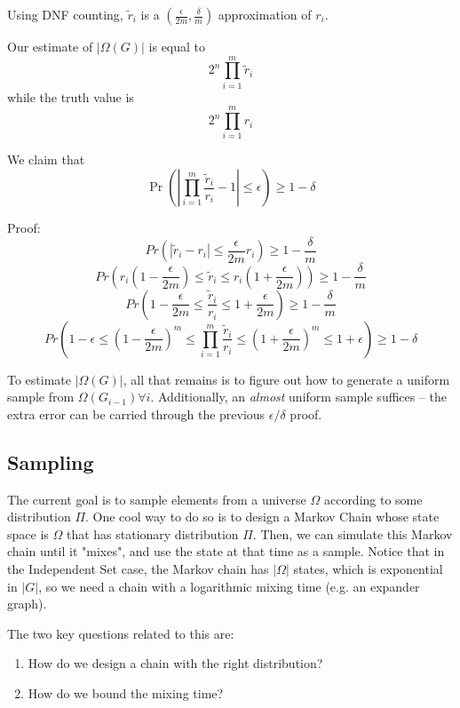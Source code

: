 Using DNF counting, $\tilde r_i$ is a $(\frac{\epsilon}{2m}, \frac{\delta}{m})$ approximation of $r_i$.

Our estimate of $|\Omega(G)|$ is equal to
\[ 2^n \prod_{i=1}^m \tilde r_i \]
while the truth value is
\[ 2^n \prod_{i=1}^m r_i \]

We claim that
\[ \Pr\left(|\prod_{i=1}^m \frac{\tilde r_i}{r_i} - 1| \leq \epsilon\right) \geq 1 - \delta \]

Proof:
\[Pr\left( |\tilde r_i - r_i | \leq \frac{\epsilon}{2m}r_i\right) \geq 1 - \frac{\delta}{m}\]
\[Pr\left( r_i(1-\frac{\epsilon}{2m}) \leq \tilde r_i \leq r_i(1+\frac{\epsilon}{2m})\right) \geq 1 - \frac{\delta}{m} \]
\[Pr\left(1 - \frac{\epsilon}{2m} \leq \frac{\tilde r_i}{r_i} \leq 1 + \frac{\epsilon}{2m}\right) \geq 1 - \frac{\delta}{m} \]
\[Pr\left(1 - \epsilon \leq (1 - \frac{\epsilon}{2m})^m \leq \prod_{i=1}^m \frac{\tilde r_i}{r_i} \leq (1 + \frac{\epsilon}{2m})^m \leq 1 + \epsilon\right) \geq 1 - \delta \]

To estimate $|\Omega(G)|$, all that remains is to figure out how to generate a uniform sample from $\Omega(G_{i-1}) \forall i$.
Additionally, an \emph{almost} uniform sample suffices -- the extra error can be carried through the previous $\epsilon/\delta$ proof.

\subsection{Sampling}
The current goal is to sample elements from a universe $\Omega$ according to some distribution $\Pi$.
  One cool way to do so is to design a Markov Chain whose state space is $\Omega$ that has stationary distribution $\Pi$. Then, we can simulate this Markov chain until it "mixes", and use the state at that time as a sample. Notice that in the Independent Set case, the Markov chain has $|\Omega|$ states, which is exponential in $|G|$, so we need a chain with a logarithmic mixing time (e.g. an expander graph).

The two key questions related to this are:
\begin{enumerate}
\item How do we design a chain with the right distribution?
\item How do we bound the mixing time?
\end{enumerate}
